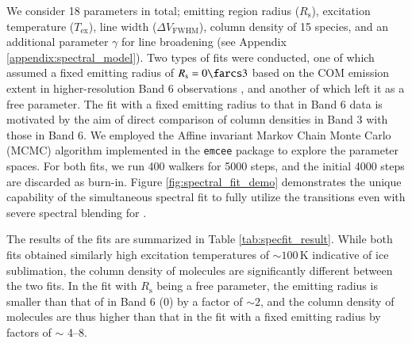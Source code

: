 \documentclass[linenumbers, twocolumn, twocolappendix, astrosymb, times]{aastex631}
\newcommand{\methanol}{CH$_3$OH\xspace}
\newcommand{\acetaldehyde}{CH$_3$CHO\xspace}
\newcommand{\acetone}{CH$_3$COCH$_3$\xspace}
\newcommand{\ethyleneoxide}{$c$-C$_2$H$_4$O\xspace}
\begin{document}
We consider 18 parameters in total; emitting region radius ($R_\mathrm{s}$), excitation temperature ($T_\mathrm{ex}$), line width ($\Delta V_\mathrm{FWHM}$), column density of 15 species, and an additional parameter $\gamma$ for line broadening (see Appendix \ref{appendix:spectral_model}). Two types of fits were conducted, one of which assumed a fixed emitting radius of $R_\mathrm{s} = 0\farcs3$ based on the COM emission extent in higher-resolution Band 6 observations \citep{Lee2019, Tobin2023}, and another of which left it as a free parameter. The fit with a fixed emitting radius to that in Band 6 data is motivated by the aim of direct comparison of column densities in Band 3 with those in Band 6. We employed the Affine invariant Markov Chain Monte Carlo (MCMC) algorithm implemented in the \texttt{emcee} package \citep{emcee} to explore the parameter spaces. For both fits, we run 400 walkers for 5000 steps, and the initial 4000 steps are discarded as burn-in. Figure \ref{fig:spectral_fit_demo} demonstrates the unique capability of the simultaneous spectral fit to fully utilize the transitions even with severe spectral blending for . 

The results of the fits are summarized in Table \ref{tab:specfit_result}. While both fits obtained similarly high excitation temperatures of $\sim100$\,K indicative of ice sublimation, the column density of molecules are significantly different between the two fits. In the fit with $R_\mathrm{s}$ being a free parameter, the emitting radius is smaller than that of in Band 6 (0) by a factor of $\sim2$, and the column density of molecules are thus higher than that in the fit with a fixed emitting radius by factors of $\sim$ 4--8.

\begin{figure*}
\caption{Demonstration of the simultaneous spectral fit for a selected frequency range in SPW 7. The observed spectra (grey) is well reproduced by the model (black) composed of multiple blended transitions of different species, \methanol, \acetaldehyde, \acetone, \ethyleneoxide, and CH$_3^{13}$CHO (dashed colored lines).}
\label{fig:spectral_fit_demo}
\end{figure*}
\end{document}
